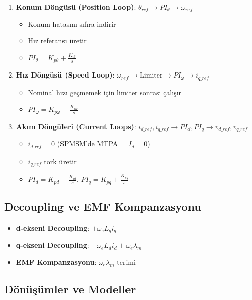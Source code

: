 \documentclass[12pt,a4paper]{article}
\begin{document}
\begin{enumerate}
    \item \textbf{Konum Döngüsü (Position Loop)}: $\theta_{ref} \rightarrow PI_\theta \rightarrow \omega_{ref}$
    \begin{itemize}
        \item Konum hatasını sıfıra indirir
        \item Hız referansı üretir
        \item $PI_\theta = K_{p\theta} + \frac{K_{i\theta}}{s}$
    \end{itemize}

    \item \textbf{Hız Döngüsü (Speed Loop)}: $\omega_{ref} \rightarrow \text{Limiter} \rightarrow PI_\omega \rightarrow i_{q\_ref}$
    \begin{itemize}
        \item Nominal hızı geçmemek için limiter sonrası çalışır
        \item $PI_\omega = K_{p\omega} + \frac{K_{i\omega}}{s}$
    \end{itemize}

    \item \textbf{Akım Döngüleri (Current Loops)}: $i_{d\_ref}, i_{q\_ref} \rightarrow PI_d, PI_q \rightarrow v_{d\_ref}, v_{q\_ref}$
    \begin{itemize}
        \item $i_{d\_ref} = 0$ (SPMSM'de MTPA = $I_d = 0$)
        \item $i_{q\_ref}$ tork üretir
        \item $PI_d = K_{pd} + \frac{K_{id}}{s}$, $PI_q = K_{pq} + \frac{K_{iq}}{s}$
    \end{itemize}
\end{enumerate}

\subsection*{Decoupling ve EMF Kompanzasyonu}

\begin{itemize}
    \item \textbf{d-ekseni Decoupling}: $+\omega_e L_q i_q$
    \item \textbf{q-ekseni Decoupling}: $+\omega_e L_d i_d + \omega_e \lambda_m$
    \item \textbf{EMF Kompanzasyonu}: $\omega_e \lambda_m$ terimi
\end{itemize}

\subsection*{Dönüşümler ve Modeller}
\end{document}
